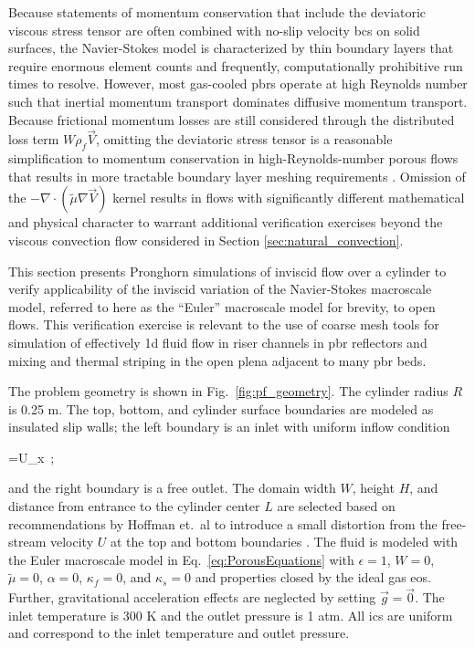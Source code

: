 Because statements of momentum conservation that include the deviatoric viscous stress tensor are often combined with no-slip velocity \glspl{bc} on solid surfaces, the Navier-Stokes model is characterized by thin boundary layers that require enormous element counts and frequently, computationally prohibitive run times to resolve. However, most gas-cooled \glspl{pbr} operate at high Reynolds number such that inertial momentum transport dominates diffusive momentum transport. Because frictional momentum losses are still considered through the distributed loss term \(W\rho_f\vec{V}\), omitting the deviatoric stress tensor is a reasonable simplification to momentum conservation in high-Reynolds-number porous flows that results in more tractable boundary layer meshing requirements \cite{kececioglu}. Omission of the \(-\nabla\cdot(\tilde{\mu}\nabla\vec{V})\) kernel results in flows with significantly different mathematical and physical character to warrant additional verification exercises beyond the viscous convection flow considered in Section \ref{sec:natural_convection}.

This section presents Pronghorn simulations of inviscid flow over a cylinder to verify applicability of the inviscid variation of the Navier-Stokes macroscale model, referred to here as the ``Euler'' macroscale model for brevity, to open flows. This verification exercise is relevant to the use of coarse mesh tools for simulation of effectively \gls{1d} fluid flow in riser channels in \gls{pbr} reflectors and mixing and thermal striping in the open plena adjacent to many \gls{pbr} beds. 

The problem geometry is shown in Fig.\ \ref{fig:pf_geometry}. The cylinder radius \(R\) is 0.25 \si{\meter}. The top, bottom, and cylinder surface boundaries are modeled as insulated slip walls; the left boundary is an inlet with uniform inflow condition

\beq
\label{eq:FreeStreamV}
=U_x\ ;
\eeq

\noindent and the right boundary is a free outlet. The domain width \(W\), height \(H\), and distance from entrance to the cylinder center \(L\) are selected based on recommendations by Hoffman et.\ al to introduce a small distortion from the free-stream velocity \(U\) at the top and bottom boundaries \cite{hoffman_2011}. The fluid is modeled with the Euler macroscale model in Eq.\ \eqref{eq:PorousEquations} with \(\epsilon=1\), \(W=0\), \(\tilde{\mu}=0\), \(\alpha=0\), \(\kappa_f=0\), and \(\kappa_s=0\) and properties closed by the ideal gas \gls{eos}. Further, gravitational acceleration effects are neglected by setting \(\vec{g}=\vec{0}\). The inlet temperature is 300 \si{\kelvin} and the outlet pressure is 1 atm. All \glspl{ic} are uniform and correspond to the inlet temperature and outlet pressure.

